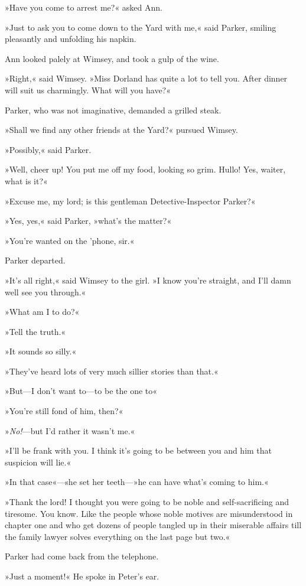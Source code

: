 »Have you come to arrest me?« asked Ann.

»Just to ask you to come down to the Yard with me,« said Parker, smiling pleasantly and unfolding his napkin.

Ann looked palely at Wimsey, and took a gulp of the wine.

»Right,« said Wimsey. »Miss Dorland has quite a lot to tell you. After dinner will suit us charmingly. What will you have?«

Parker, who was not imaginative, demanded a grilled steak.

»Shall we find any other friends at the Yard?« pursued Wimsey.

»Possibly,« said Parker.

»Well, cheer up! You put me off my food, looking so grim. Hullo! Yes, waiter, what is it?«

»Excuse me, my lord; is this gentleman Detective-Inspector Parker?«

»Yes, yes,« said Parker, »what's the matter?«

»You're wanted on the 'phone, sir.«

Parker departed.

»It's all right,« said Wimsey to the girl. »I know you're straight, and I'll damn well see you through.«

»What am I to do?«

»Tell the truth.«

»It sounds so silly.«

»They've heard lots of very much sillier stories than that.«

»But—I don't want to—to be the one to\longdash«

»You're still fond of him, then?«

»\textit{No!}—but I'd rather it wasn't me.«

»I'll be frank with you. I think it's going to be between you and him that suspicion will lie.«

»In that case«—she set her teeth—»he can have what's coming to him.«

»Thank the lord! I thought you were going to be noble and self-sacrificing and tiresome. You know. Like the people whose noble motives are misunderstood in chapter one and who get dozens of people tangled up in their miserable affairs till the family lawyer solves everything on the last page but two.«

Parker had come back from the telephone.

»Just a moment!« He spoke in Peter's ear.

